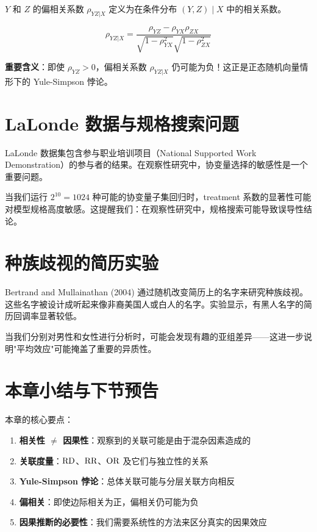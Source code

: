 $Y$ 和 $Z$ 的偏相关系数 $\rho_{YZ|X}$ 定义为在条件分布 $(Y, Z) \mid X$ 中的相关系数。

\begin{Proposition}[偏相关系数公式]\label{prop:partial-correlation}
\[
\rho_{YZ|X} = \frac{\rho_{YZ} - \rho_{YX}\rho_{ZX}}{\sqrt{1-\rho_{YX}^2}\sqrt{1-\rho_{ZX}^2}}
\]
\end{Proposition}

\textbf{重要含义}：即使 $\rho_{YZ} > 0$，偏相关系数 $\rho_{YZ|X}$ 仍可能为负！这正是正态随机向量情形下的 Yule-Simpson 悖论。

\section{LaLonde 数据与规格搜索问题}

LaLonde 数据集包含参与职业培训项目（National Supported Work Demonstration）的参与者的结果。在观察性研究中，协变量选择的敏感性是一个重要问题。

当我们运行 $2^{10} = 1024$ 种可能的协变量子集回归时，treatment 系数的显著性可能对模型规格高度敏感。这提醒我们：在观察性研究中，规格搜索可能导致误导性结论。

\section{种族歧视的简历实验}

Bertrand and Mullainathan (2004) 通过随机改变简历上的名字来研究种族歧视。这些名字被设计成听起来像非裔美国人或白人的名字。实验显示，有黑人名字的简历回调率显著较低。

当我们分别对男性和女性进行分析时，可能会发现有趣的亚组差异——这进一步说明"平均效应"可能掩盖了重要的异质性。

\section{本章小结与下节预告}

本章的核心要点：
\begin{enumerate}
  \item \textbf{相关性 $\neq$ 因果性}：观察到的关联可能是由于混杂因素造成的
  \item \textbf{关联度量}：$\text{RD}$、$\text{RR}$、$\text{OR}$ 及它们与独立性的关系
  \item \textbf{Yule-Simpson 悖论}：总体关联可能与分层关联方向相反
  \item \textbf{偏相关}：即使边际相关为正，偏相关仍可能为负
  \item \textbf{因果推断的必要性}：我们需要系统性的方法来区分真实的因果效应
\end{enumerate}

